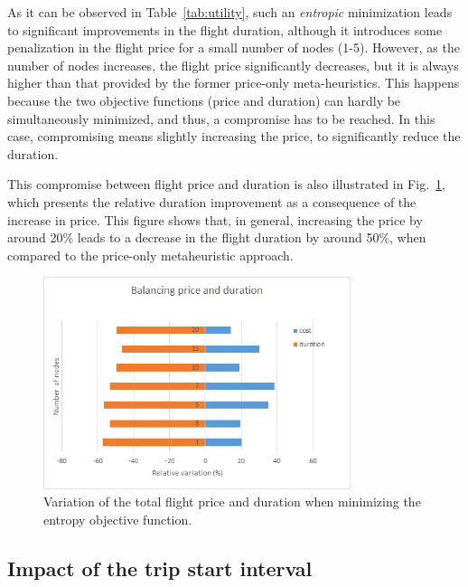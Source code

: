 
As it can be observed in Table~\ref{tab:utility}, such an \textit{entropic} minimization leads to significant improvements in the flight duration, although it introduces some penalization in the flight price for a small number of nodes (1-5). However, as the number of nodes increases, the flight price significantly decreases, but it is always higher than that provided by the former price-only meta-heuristics. This happens because the two objective functions (price and duration) can hardly be simultaneously minimized, and thus, a compromise has to be reached. In this case, compromising means slightly increasing the price, to significantly reduce the duration.

This compromise between flight price and duration is also illustrated in Fig.~\ref{fig:cost_vs_time}, which presents the relative duration improvement as a consequence of the increase in price. This figure shows that, in general, increasing the price by around 20\% leads to a decrease in the flight duration by around 50\%, when compared to the price-only metaheuristic approach.

\begin{figure}
  \centering
  \includegraphics[width=9cm]{./imgs/cost_vs_time.png}
  \caption{Variation of the total flight price and duration when minimizing the entropy objective function.}
  \label{fig:cost_vs_time}  
\end{figure}


\subsection{Impact of the trip start interval}
\label{sec:start_impact}

